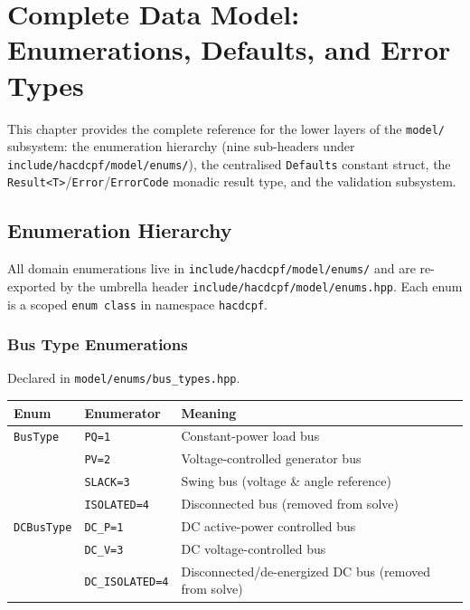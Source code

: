 \section{Complete Data Model: Enumerations, Defaults, and Error Types}
\label{sec:data-model-deep}

This chapter provides the complete reference for the lower layers of the
\texttt{model/} subsystem: the enumeration hierarchy (nine sub-headers under
\texttt{include/hacdcpf/model/enums/}), the centralised \texttt{Defaults}
constant struct, the \texttt{Result<T>}/\texttt{Error}/\texttt{ErrorCode}
monadic result type, and the validation subsystem.

\subsection{Enumeration Hierarchy}
\label{sec:enums}

All domain enumerations live in \texttt{include/hacdcpf/model/enums/} and are
re-exported by the umbrella header \texttt{include/hacdcpf/model/enums.hpp}.
Each enum is a scoped \texttt{enum class} in namespace \texttt{hacdcpf}.

\subsubsection{Bus Type Enumerations}
\label{sec:bus-enums}

Declared in \texttt{model/enums/bus\_types.hpp}.

\begin{center}
\begin{tabular}{lll}
\hline\hline
\textbf{Enum} & \textbf{Enumerator} & \textbf{Meaning} \\
\hline
\texttt{BusType} & \texttt{PQ=1} & Constant-power load bus \\
 & \texttt{PV=2} & Voltage-controlled generator bus \\
 & \texttt{SLACK=3} & Swing bus (voltage \& angle reference) \\
 & \texttt{ISOLATED=4} & Disconnected bus (removed from solve) \\
\hline
\texttt{DCBusType} & \texttt{DC\_P=1} & DC active-power controlled bus \\
 & \texttt{DC\_V=3} & DC voltage-controlled bus \\
 & \texttt{DC\_ISOLATED=4} & Disconnected/de-energized DC bus (removed from solve) \\
\hline\hline
\end{tabular}
\end{center}

